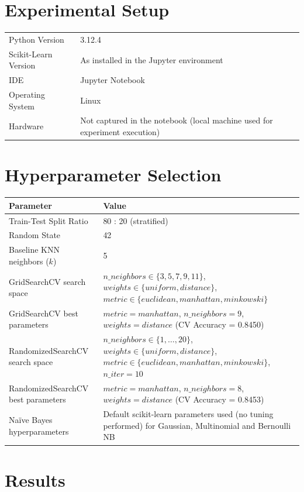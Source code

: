\documentclass[12pt,a4paper]{article}
\begin{document}
\section{Experimental Setup}
\begin{tabular}{ll}
\toprule
Python Version & 3.12.4\\
Scikit-Learn Version & As installed in the Jupyter environment \\
IDE & Jupyter Notebook\\
Operating System & Linux\\
Hardware & Not captured in the notebook (local machine used for experiment execution)\\
\bottomrule
\end{tabular}

\section{Hyperparameter Selection}

\begin{tabular}{ll}
\toprule
Parameter & Value\\
\midrule
Train-Test Split Ratio & 80 : 20 (stratified)\\
Random State & 42\\
Baseline KNN neighbors ($k$) & 5\\
GridSearchCV search space & $n\_neighbors \in \{3,5,7,9,11\}$, $weights \in \{uniform, distance\}$, $metric \in \{euclidean, manhattan, minkowski\}$\\
GridSearchCV best parameters & $metric=manhattan$, $n\_neighbors=9$, $weights=distance$ (CV Accuracy = 0.8450)\\
RandomizedSearchCV search space & $n\_neighbors \in \{1,\dots,20\}$, $weights \in \{uniform, distance\}$, $metric \in \{euclidean, manhattan, minkowski\}$, $n\_iter=10$\\
RandomizedSearchCV best parameters & $metric=manhattan$, $n\_neighbors=8$, $weights=distance$ (CV Accuracy = 0.8453)\\
Na\"ive Bayes hyperparameters & Default scikit-learn parameters used (no tuning performed) for Gaussian, Multinomial and Bernoulli NB\\
\bottomrule
\end{tabular}

\section{Results}
\end{document}
